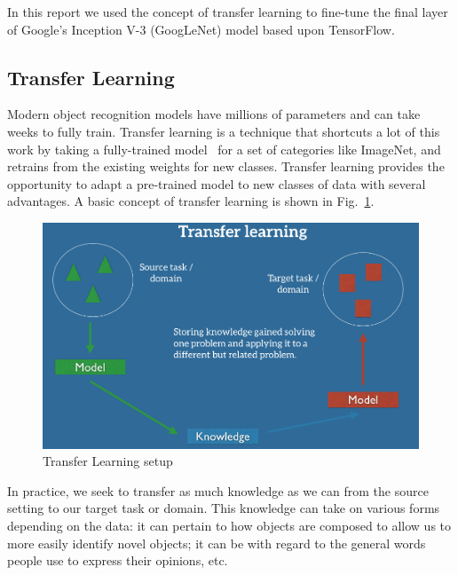 In this report we used the concept of transfer learning to fine-tune the final layer of Google’s Inception V-3 (GoogLeNet) model based upon TensorFlow.

\subsection{Transfer Learning}
Modern object recognition models have millions of parameters and can take weeks to fully train. Transfer learning is a technique that shortcuts a lot of this work by taking a fully-trained model~\cite{pan2010survey} for a set of categories like ImageNet, and retrains from the existing weights for new classes. Transfer learning provides the opportunity to adapt a pre-trained model to new classes of data with several advantages. A basic concept of transfer learning is shown in Fig.~\ref{fig: transfer}.

\begin{figure}[h]
	\includegraphics[width=1\linewidth]{fin_img_13}
	\centering
	\caption{\label{fig: transfer}Transfer Learning setup}
\end{figure}

In practice, we seek to transfer as much knowledge as we can from the source setting to our target task or domain. This knowledge can take on various forms depending on the data: it can pertain to how objects are composed to allow us to more easily identify novel objects; it can be with regard to the general words people use to express their opinions, etc. 

